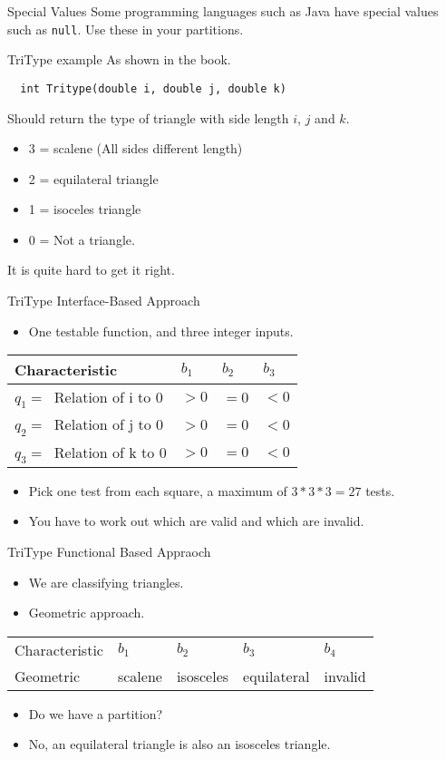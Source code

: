 \documentclass{beamer}
\begin{document}
\begin{frame}{Special Values}
  Some programming languages such as Java have special values such as
  {\tt null}. Use these in your partitions. 
\end{frame}
\begin{frame}[fragile]{TriType example}
As shown in the book.
  \begin{lstlisting}
  int Tritype(double i, double j, double k)
  \end{lstlisting}
Should return  the type of triangle with side length $i$, $j$ and $k$.
  \begin{itemize}
  \item 3 = scalene (All sides different length)
  \item 2 = equilateral triangle
  \item 1 = isoceles triangle 
  \item 0 = Not a triangle.
  \end{itemize}
It is quite hard to get it right.
\end{frame}
\begin{frame}{TriType Interface-Based Approach}
  \begin{itemize}
  \item One testable function, and three integer inputs.
  \end{itemize}
  \begin{tabular}{||l|l|l|l||}
\hline 
 Characteristic & $b_1$ &  $b_2$ & $b_3$ \\ \hline
 $q_1 = \ $ Relation of i  to $0$ & $>0$ & $=0$ & $<0$ \\
 $q_2 = \ $ Relation of j  to $0$ & $>0$ & $=0$ & $<0$ \\
 $q_3 = \ $ Relation of k  to $0$ & $>0$ & $=0$ & $<0$ \\
\hline    
\end{tabular}
\begin{itemize}
\item Pick one test from each square, a maximum of $3*3*3=27$ tests. 
\item You have to work out which are valid and which are invalid.
\end{itemize}
\end{frame}
\begin{frame}{TriType  Functional Based Appraoch}
  \begin{itemize}
  \item We are classifying triangles.
  \item Geometric approach.
  \end{itemize}
  \begin{tabular}{||l|l|l|l|l||}\hline 
    Characteristic & $b_1$  & $b_2$ & $b_3$ & $b_4$\\
    Geometric  &  scalene & isosceles &
    equilateral & invalid \\
    \hline
  \end{tabular}
  \begin{itemize}
  \item Do we have a partition? 
  \item No, an equilateral triangle is also an isosceles triangle.
  \end{itemize}
\end{frame}
\end{document}
